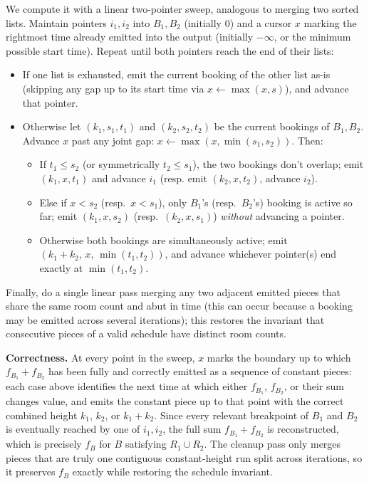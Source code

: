 \documentclass[12pt,twoside]{article}
\begin{document}
\begin{problems}
\begin{problemparts}
We compute it with a linear two-pointer sweep, analogous to merging two
sorted lists. Maintain pointers $i_1, i_2$ into $B_1, B_2$ (initially $0$)
and a cursor $x$ marking the rightmost time already emitted into the output
(initially $-\infty$, or the minimum possible start time). Repeat until both
pointers reach the end of their lists:
\begin{itemize}[label=\textbullet]
  \item If one list is exhausted, emit the current booking of the other
        list as-is (skipping any gap up to its start time via
        $x \gets \max(x, s)$), and advance that pointer.
  \item Otherwise let $(k_1,s_1,t_1)$ and $(k_2,s_2,t_2)$ be the current
        bookings of $B_1,B_2$. Advance $x$ past any joint gap:
        $x \gets \max(x,\min(s_1,s_2))$. Then:
        \begin{itemize}[label=\textbullet]
          \item If $t_1 \le s_2$ (or symmetrically $t_2\le s_1$), the two
                bookings don't overlap; emit $(k_1, x, t_1)$ and advance
                $i_1$ (resp. emit $(k_2,x,t_2)$, advance $i_2$).
          \item Else if $x < s_2$ (resp.\ $x<s_1$), only $B_1$'s (resp.\
                $B_2$'s) booking is active so far; emit $(k_1,x,s_2)$
                (resp.\ $(k_2,x,s_1)$) \emph{without} advancing a pointer.
          \item Otherwise both bookings are simultaneously active; emit
                $(k_1+k_2,\, x,\, \min(t_1,t_2))$, and advance whichever
                pointer(s) end exactly at $\min(t_1,t_2)$.
        \end{itemize}
\end{itemize}
Finally, do a single linear pass merging any two adjacent emitted pieces
that share the same room count and abut in time (this can occur because a
booking may be emitted across several iterations); this restores the
invariant that consecutive pieces of a valid schedule have distinct room
counts.

\textbf{Correctness.} At every point in the sweep, $x$ marks the boundary
up to which $f_{B_1}+f_{B_2}$ has been fully and correctly emitted as a
sequence of constant pieces: each case above identifies the next time at
which either $f_{B_1}$, $f_{B_2}$, or their sum changes value, and emits the
constant piece up to that point with the correct combined height $k_1$,
$k_2$, or $k_1+k_2$. Since every relevant breakpoint of $B_1$ and $B_2$ is
eventually reached by one of $i_1,i_2$, the full sum $f_{B_1}+f_{B_2}$ is
reconstructed, which is precisely $f_B$ for $B$ satisfying $R_1\cup R_2$.
The cleanup pass only merges pieces that are truly one contiguous
constant-height run split across iterations, so it preserves $f_B$ exactly
while restoring the schedule invariant.


\end{problemparts}
\end{problems}
\end{document}

